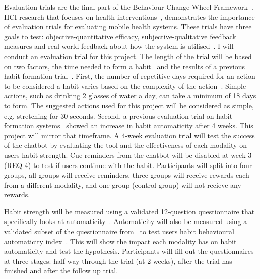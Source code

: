 Evaluation trials are the final part of the Behaviour Change Wheel Framework~\cite{article_behaviour_change_wheel}.
HCI research that focuses on health interventions~\cite{article_mhealth}, demonstrates the importance of evaluation trials for evaluating mobile health systems.
These trials have three goals to test: objective-quantitative efficacy, subjective-qualitative feedback measures and real-world feedback about how the system is
utilised~\cite{article_evaluate_tech_health_behaviour_change}. I will conduct an evaluation trial for this project.\newline
\newline
The length of the trial will be based on two factors, the time needed to form a habit~\cite{article_how_habits_formed_modelling_habit_formation} and the results of a previous
habit formation trial~\cite{article_beyond_self_tracking_designing_apps}.
First, the number of repetitive days required for an action to be considered a habit varies based on the complexity of the action~\cite{article_how_habits_formed_modelling_habit_formation}.
Simple actions, such as drinking 2 glasses of water a day, can take a minimum of 18 days to form.
The suggested actions used for this project will be considered as simple, e.g. stretching for 30 seconds.
Second, a previous evaluation trial on habit-formation systems~\cite{article_how_habits_formed_modelling_habit_formation} showed an increase in habit automaticity after 4 weeks.
This project will mirror that timeframe.\newline
\newline
A 4-week evaluation trial will test the success of the chatbot by evaluating the tool and the effectiveness of each modality on users habit strength.
Cue reminders from the chatbot will be disabled at week 3 (REQ 4) to test if users continue with the habit.
Participants will split into four groups, all groups will receive reminders, three groups will receive rewards each from a different modality,
and one group (control group) will not recieve any rewards.

Habit strength will be measured using a validated 12-question questionnaire that specifically looks at automaticity~\cite{article_habit_strength}.
Automaticity will also be measured using a validated subset of the questionnaire from~\cite{article_habit_strength} to test users habit behavioural
automaticity index~\cite{article_4q_SRBAI}. This will show the impact each modality has on habit automaticity and test the hypothesis.
Participants will fill out the questionnaires~\cite{article_habit_strength, article_4q_SRBAI} at three stages: half-way through the trial (at 2-weeks),
after the trial has finished and after the follow up trial.

